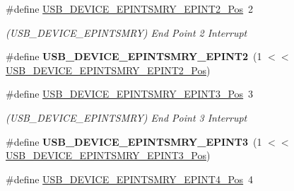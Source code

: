 \begin{DoxyCompactItemize}
\item 
\hypertarget{group___s_a_m_l21___u_s_b_ga2819777cab6b374670d365d26af7c0d7}{}\#define \hyperlink{group___s_a_m_l21___u_s_b_ga2819777cab6b374670d365d26af7c0d7}{U\+S\+B\+\_\+\+D\+E\+V\+I\+C\+E\+\_\+\+E\+P\+I\+N\+T\+S\+M\+R\+Y\+\_\+\+E\+P\+I\+N\+T2\+\_\+\+Pos}~2\label{group___s_a_m_l21___u_s_b_ga2819777cab6b374670d365d26af7c0d7}

\begin{DoxyCompactList}\small\item\em (U\+S\+B\+\_\+\+D\+E\+V\+I\+C\+E\+\_\+\+E\+P\+I\+N\+T\+S\+M\+R\+Y) End Point 2 Interrupt \end{DoxyCompactList}\item 
\hypertarget{group___s_a_m_l21___u_s_b_gafec0747f94f8d9f10208e1bc4c61f2ae}{}\#define {\bfseries U\+S\+B\+\_\+\+D\+E\+V\+I\+C\+E\+\_\+\+E\+P\+I\+N\+T\+S\+M\+R\+Y\+\_\+\+E\+P\+I\+N\+T2}~(1 $<$$<$ \hyperlink{group___s_a_m_l21___u_s_b_ga2819777cab6b374670d365d26af7c0d7}{U\+S\+B\+\_\+\+D\+E\+V\+I\+C\+E\+\_\+\+E\+P\+I\+N\+T\+S\+M\+R\+Y\+\_\+\+E\+P\+I\+N\+T2\+\_\+\+Pos})\label{group___s_a_m_l21___u_s_b_gafec0747f94f8d9f10208e1bc4c61f2ae}

\item 
\hypertarget{group___s_a_m_l21___u_s_b_ga954b3c4af55fccee83598255fc7a8dad}{}\#define \hyperlink{group___s_a_m_l21___u_s_b_ga954b3c4af55fccee83598255fc7a8dad}{U\+S\+B\+\_\+\+D\+E\+V\+I\+C\+E\+\_\+\+E\+P\+I\+N\+T\+S\+M\+R\+Y\+\_\+\+E\+P\+I\+N\+T3\+\_\+\+Pos}~3\label{group___s_a_m_l21___u_s_b_ga954b3c4af55fccee83598255fc7a8dad}

\begin{DoxyCompactList}\small\item\em (U\+S\+B\+\_\+\+D\+E\+V\+I\+C\+E\+\_\+\+E\+P\+I\+N\+T\+S\+M\+R\+Y) End Point 3 Interrupt \end{DoxyCompactList}\item 
\hypertarget{group___s_a_m_l21___u_s_b_ga747e0d44bfa4279a88220d66183167dc}{}\#define {\bfseries U\+S\+B\+\_\+\+D\+E\+V\+I\+C\+E\+\_\+\+E\+P\+I\+N\+T\+S\+M\+R\+Y\+\_\+\+E\+P\+I\+N\+T3}~(1 $<$$<$ \hyperlink{group___s_a_m_l21___u_s_b_ga954b3c4af55fccee83598255fc7a8dad}{U\+S\+B\+\_\+\+D\+E\+V\+I\+C\+E\+\_\+\+E\+P\+I\+N\+T\+S\+M\+R\+Y\+\_\+\+E\+P\+I\+N\+T3\+\_\+\+Pos})\label{group___s_a_m_l21___u_s_b_ga747e0d44bfa4279a88220d66183167dc}

\item 
\hypertarget{group___s_a_m_l21___u_s_b_gacd65c192a664ec0c792e39cf4a1d0364}{}\#define \hyperlink{group___s_a_m_l21___u_s_b_gacd65c192a664ec0c792e39cf4a1d0364}{U\+S\+B\+\_\+\+D\+E\+V\+I\+C\+E\+\_\+\+E\+P\+I\+N\+T\+S\+M\+R\+Y\+\_\+\+E\+P\+I\+N\+T4\+\_\+\+Pos}~4\label{group___s_a_m_l21___u_s_b_gacd65c192a664ec0c792e39cf4a1d0364}


\end{DoxyCompactItemize}
